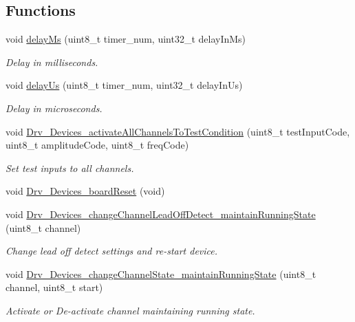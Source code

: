 \subsection*{Functions}
\begin{DoxyCompactItemize}
\item 
void \hyperlink{group__Devices__Library_gadde208bf0ea8bb35d8606d3859219a40}{delay\+Ms} (uint8\+\_\+t timer\+\_\+num, uint32\+\_\+t delay\+In\+Ms)
\begin{DoxyCompactList}\small\item\em Delay in milliseconds. \end{DoxyCompactList}\item 
void \hyperlink{group__Devices__Library_ga120f8cfcae7121ef62deee0473cf19ee}{delay\+Us} (uint8\+\_\+t timer\+\_\+num, uint32\+\_\+t delay\+In\+Us)
\begin{DoxyCompactList}\small\item\em Delay in microseconds. \end{DoxyCompactList}\item 
void \hyperlink{group__Devices__Library_ga42ce5be2b197d04b4b0a9918a11ea457}{Drv\+\_\+\+Devices\+\_\+activate\+All\+Channels\+To\+Test\+Condition} (uint8\+\_\+t test\+Input\+Code, uint8\+\_\+t amplitude\+Code, uint8\+\_\+t freq\+Code)
\begin{DoxyCompactList}\small\item\em Set test inputs to all channels. \end{DoxyCompactList}\item 
void \hyperlink{group__Devices__Library_gab949068810476a2e08078aa7eab15a83}{Drv\+\_\+\+Devices\+\_\+board\+Reset} (void)
\item 
void \hyperlink{group__Devices__Library_ga87716766599b761bde56572ccaac7946}{Drv\+\_\+\+Devices\+\_\+change\+Channel\+Lead\+Off\+Detect\+\_\+maintain\+Running\+State} (uint8\+\_\+t channel)
\begin{DoxyCompactList}\small\item\em Change lead off detect settings and re-\/start device. \end{DoxyCompactList}\item 
void \hyperlink{group__Devices__Library_gacf4dbff760e8426996f21c8a68d77cef}{Drv\+\_\+\+Devices\+\_\+change\+Channel\+State\+\_\+maintain\+Running\+State} (uint8\+\_\+t channel, uint8\+\_\+t start)
\begin{DoxyCompactList}\small\item\em Activate or De-\/activate channel maintaining running state. \end{DoxyCompactList}\item 

\end{DoxyCompactItemize}
